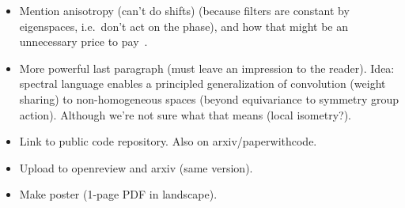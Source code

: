 \begin{itemize}
    \item Mention anisotropy (can't do shifts) (because filters are constant by eigenspaces, i.e.\ don't act on the phase), and how that might be an unnecessary price to pay~\cite{defferrard2020deepsphere}.
    \item More powerful last paragraph (must leave an impression to the reader). Idea: spectral language enables a principled generalization of convolution (weight sharing) to non-homogeneous spaces (beyond equivariance to symmetry group action). Although we're not sure what that means (local isometry?).
    \item Link to public code repository. Also on arxiv/paperwithcode.
    \item Upload to openreview and arxiv (same version).
    \item Make poster (1-page PDF in landscape).
\end{itemize}
\clearpage
